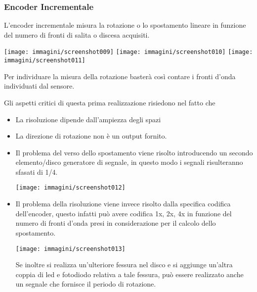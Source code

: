 \documentclass[a4paper, 15pt]{article}
\newcommand{\cmark}{\ding{51}}
\newcommand{\xmark}{\ding{55}}
\begin{document}
\subsubsection{Encoder Incrementale}
\begin{adjustwidth}{2in}{}
	L'encoder incrementale misura la rotazione o lo spostamento lineare in funzione del numero di fronti di salita o discesa acquisiti. 
	\begin{center}
		\texttt{[image: immagini/screenshot009]}
		\texttt{[image: immagini/screenshot010]}
		\texttt{[image: immagini/screenshot011]}
	\end{center}
	Per individuare la misura della rotazione basterà così contare i fronti d'onda individuati dal sensore. 
	
	Gli aspetti critici di questa prima realizzazione risiedono nel fatto che
	\begin{itemize}[label={\textcolor{red}{\xmark}}]
		\item La risoluzione dipende dall'ampiezza degli spazi
		\item La direzione di rotazione non è un output fornito.
	\end{itemize} 
	\begin{itemize}[label={\textcolor{green}{\cmark}}]
		\item Il problema del verso dello spostamento viene risolto introducendo un secondo elemento/disco generatore di segnale, in questo modo i segnali risulteranno sfasati di 1/4.
		\begin{center}
			\texttt{[image: immagini/screenshot012]}
		\end{center}
		\item Il problema della risoluzione viene invece risolto dalla specifica codifica dell'encoder, questo infatti può avere codifica 1x, 2x, 4x in funzione del numero di fronti d'onda presi in considerazione per il calcolo dello spostamento.
		\begin{center}
			\texttt{[image: immagini/screenshot013]}
		\end{center}
		Se inoltre si realizza un'ulteriore fessura nel disco e si aggiunge un'altra coppia di led e fotodiodo relativa a tale fessura, può essere realizzato anche un segnale che fornisce il periodo di rotazione.		
	\end{itemize}
\end{adjustwidth}
\end{document}
